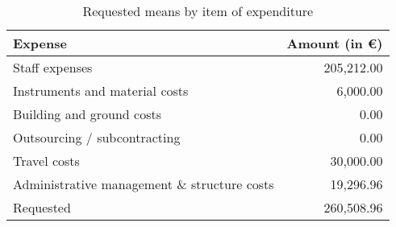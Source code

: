 \begin{table}[htbp]
  \caption{Requested means by item of expenditure}
  \centering
  \begin{tabular}{|l|r|}
    \hline 
    Expense                                      & Amount (in \euro) \\ \hline \hline
    Staff expenses                               & 205,212.00 \\ \hline
    Instruments and material costs               & 6,000.00  \\ \hline
    Building and ground costs                    & 0.00  \\ \hline
    Outsourcing / subcontracting                 & 0.00 \\ \hline
    Travel costs                                 & 30,000.00  \\  \hline
    Administrative management \& structure costs & 19,296.96 \\ \hline
    Requested                                    & 260,508.96 \\ \hline
    \hline
  \end{tabular}
  \label{tab:grant}
\end{table}
